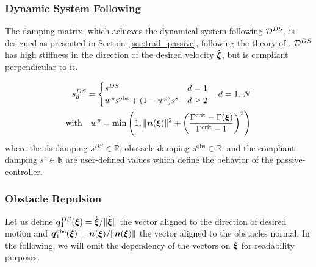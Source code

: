 \documentclass[conference]{IEEEtran}
\begin{document}
\subsubsection{Dynamic System Following}
The damping matrix, which achieves the dynamical system following $\mathcal{D}^{DS}$, is designed as presented in Section~\ref{sec:trad_passive}, following the theory of \cite{kronander2015passive}. $\mathcal{D}^{DS}$ has high stiffness in the direction of the desired velocity $\dot{\boldsymbol{\xi}}$, but is compliant perpendicular to it.

\begin{equation}
  \begin{split}
  s_d^{DS} =
  \begin{cases}
    s^{DS} & d = 1 \\
    w^p s^{\mathrm{obs}} + (1- w^p) s^s & d \geq 2 
  \end{cases} \quad d = 1 .. N\\
  \text{with} \quad
   w^p = \min \left(1,  \| \boldsymbol{n}(\boldsymbol{\xi}) \|^2 + \left(\frac{\Gamma^{\mathrm{crit}} -\Gamma(\boldsymbol{\xi})}{\Gamma^{\mathrm{crit}} - 1}\right) ^2 \right)
  \end{split}
\end{equation}
where the ds-damping $s^{DS} \in \mathbb{R}$, obstacle-damping $s^{\mathrm{obs}} \in \mathbb{R}$, and the compliant-damping $s^c \in \mathbb{R}$ are user-defined values which define the behavior of the passive-controller.


\subsubsection{Obstacle Repulsion}
Let us define $\boldsymbol{q}^{DS}_1 (\boldsymbol{\xi}) = \dot{\boldsymbol{\xi}} / \lVert \dot{\boldsymbol{\xi}}\rVert$ the vector aligned to the direction of desired motion and $\boldsymbol{q}_1^{\mathrm{obs}}(\boldsymbol{\xi}) =  \boldsymbol{n}(\boldsymbol{\xi}) / \lVert\boldsymbol{n}(\boldsymbol{\xi})\rVert$ the vector aligned to the obstacles normal.
In the following, we will omit the dependency of the vectors on $\boldsymbol{\xi}$ for readability purposes.
\end{document}
